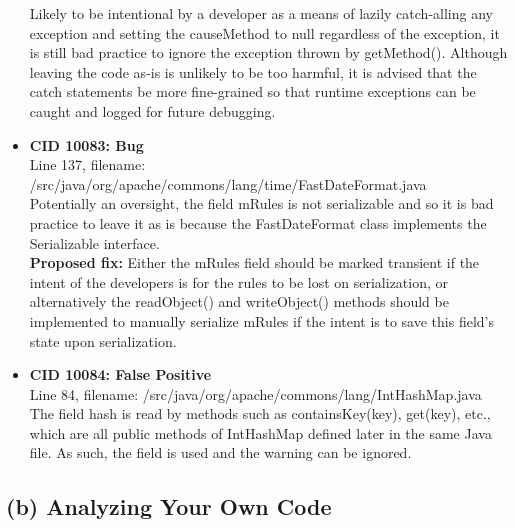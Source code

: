 \documentclass{article}
\begin{document}
\begin{itemize}
    Likely to be intentional by a developer as a means of lazily catch-alling any exception and setting the causeMethod
    to null regardless of the exception, it is still bad practice to ignore the exception thrown by getMethod(). Although
    leaving the code as-is is unlikely to be too harmful, it is advised that the catch statements be more fine-grained so that 
    runtime exceptions can be caught and logged for future debugging.
\item \textbf{CID 10083: Bug} \\
    Line 137, filename: /src/java/org/apache/commons/lang/time/FastDateFormat.java \\
    Potentially an oversight, the field mRules is not serializable and so it is bad practice to leave it 
    as is because the FastDateFormat class implements the Serializable interface. \\
    \textbf{Proposed fix:} Either the mRules field should be marked transient if the intent of the developers 
    is for the rules to be lost on serialization, or alternatively the readObject() and writeObject() methods 
    should be implemented to manually serialize mRules if the intent is to save this field's state upon serialization.
\item \textbf{CID 10084: False Positive} \\
    Line 84, filename: /src/java/org/apache/commons/lang/IntHashMap.java \\
    The field hash is read by methods such as containsKey(key), get(key), etc., which are all public methods of
    IntHashMap defined later in the same Java file. As such, the field is used and the warning can be ignored.
\end{itemize}

\subsection*{(b) Analyzing Your Own Code}
\end{document}
